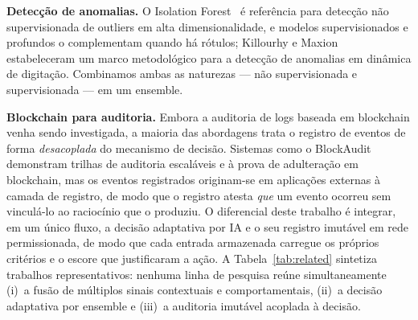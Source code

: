 \documentclass[conference]{IEEEtran}
\begin{document}
\textbf{Detecção de anomalias.} O Isolation Forest~\cite{liu2008} é
referência para detecção não supervisionada de outliers em alta
dimensionalidade, e modelos supervisionados e profundos
\cite{goodfellow2016} o complementam quando há rótulos; Killourhy e
Maxion~\cite{killourhy2009} estabeleceram um marco metodológico para a
detecção de anomalias em dinâmica de digitação. Combinamos ambas as
naturezas --- não supervisionada e supervisionada --- em um ensemble.

\textbf{Blockchain para auditoria.} Embora a auditoria de logs baseada em
blockchain venha sendo investigada, a maioria das abordagens trata o
registro de eventos de forma \emph{desacoplada} do mecanismo de decisão.
Sistemas como o BlockAudit~\cite{blockaudit} demonstram trilhas de
auditoria escaláveis e à prova de adulteração em blockchain, mas os
eventos registrados originam-se em aplicações externas à camada de
registro, de modo que o registro atesta \emph{que} um evento ocorreu sem
vinculá-lo ao raciocínio que o produziu. O diferencial deste trabalho é
integrar, em um único fluxo, a decisão adaptativa por IA e o seu registro
imutável em rede permissionada, de modo que cada entrada armazenada
carregue os próprios critérios e o escore que justificaram a ação. A
Tabela~\ref{tab:related} sintetiza trabalhos representativos: nenhuma
linha de pesquisa reúne simultaneamente (i)~a fusão de múltiplos sinais
contextuais e comportamentais, (ii)~a decisão adaptativa por ensemble e
(iii)~a auditoria imutável acoplada à decisão.
\end{document}
